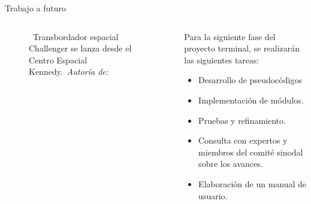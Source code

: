 \begin{frame}{Trabajo a futuro}
\begin{columns}
\begin{column}{0.4\textwidth}
\begin{figure}[H]
{                }
                \vspace{-0.25cm}
                \caption{\tiny~Transbordador espacial Challenger se lanza desde el Centro Espacial Kennedy.~\textit{Autoría de:}~\cite{nasa_challenger_unsplash}}%
                \label{fig:PyQt_logo}
            \end{figure}
        \end{column}
        \begin{column}{0.6\textwidth}
            Para la siguiente fase del proyecto terminal, se realizarán las siguientes tareas:
            \begin{itemize}
                \item Desarrollo de pseudocódigos
                \item Implementación de módulos.
                \item Pruebas y refinamiento.
                \item Consulta con expertos y miembros del comité sinodal sobre los avances.
                \item Elaboración de un manual de usuario.
            \end{itemize}
        \end{column}
    \end{columns}
\end{frame}